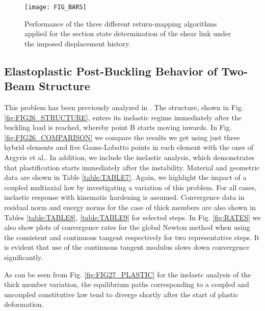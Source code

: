  \begin{figure}[b]
 	\centering
 	\texttt{[image: FIG\_BARS]}
 	\caption{Performance of the three different return-mapping algorithms 
 	applied for the section state determination of the shear link under the 
 	imposed displacement history.}
 	\label{fig:FIG_BARS}
 \end{figure}
\clearpage
\subsection{Elastoplastic Post-Buckling Behavior of Two-Beam Structure}

This problem has been previously analyzed in \cite{Argyris1982,Ridha1971}. The 
structure, shown in Fig. \ref{fig:FIG26_STRUCTURE}, enters its inelastic regime 
immediately after the buckling 
load is reached, whereby point B starts moving inwards. In 
Fig. \ref{fig:FIG26_COMPARISON} we compare the 
results we get using just three hybrid elements and five Gauss-Lobatto points 
in each 
element with the ones of Argyris et al.\cite{Argyris1982}. In addition, we 
include the 
inelastic analysis, which demonstrates that plastification starts immediately 
after the instability. Material and geometric data are shown in 
Table \ref{table:TABLE7}. Again, we highlight the impact of a coupled 
multiaxial law by 
investigating a variation of this problem. For all cases, inelastic response 
with kinematic hardening is assumed. Convergence data in residual norm and 
energy norms for the case of thick members are also shown in Tables 
\ref{table:TABLE8}, \ref{table:TABLE9} for selected steps. In Fig. 
\ref{fig:RATES} we also show 
plots of convergence rates for the global Newton method when using the 
consistent and continuous tangent respectively for two representative steps. It 
is evident that use of the continuous tangent modulus slows down convergence 
significantly.

As can be seen from 
Fig. \ref{fig:FIG27_PLASTIC} for the inelastc analysis of 
the thick member variation, the equilibrium paths corresponding to a coupled 
and uncoupled constitutive law tend to diverge shortly after the start of 
plastic deformation.

